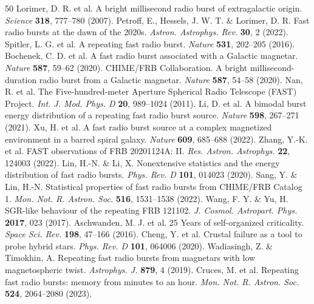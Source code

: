 \documentclass[twocolumn]{article}
\begin{document}

\begin{thebibliography}{50}
 Lorimer, D. R. et al. A bright millisecond radio burst of extragalactic origin. \textit{Science} \textbf{318}, 777--780 (2007).
 Petroff, E., Hessels, J. W. T. \& Lorimer, D. R. Fast radio bursts at the dawn of the 2020s. \textit{Astron. Astrophys. Rev.} \textbf{30}, 2 (2022).
 Spitler, L. G. et al. A repeating fast radio burst. \textit{Nature} \textbf{531}, 202--205 (2016).
 Bochenek, C. D. et al. A fast radio burst associated with a Galactic magnetar. \textit{Nature} \textbf{587}, 59--62 (2020).
 CHIME/FRB Collaboration. A bright millisecond-duration radio burst from a Galactic magnetar. \textit{Nature} \textbf{587}, 54--58 (2020).
 Nan, R. et al. The Five-hundred-meter Aperture Spherical Radio Telescope (FAST) Project. \textit{Int. J. Mod. Phys. D} \textbf{20}, 989--1024 (2011).
 Li, D. et al. A bimodal burst energy distribution of a repeating fast radio burst source. \textit{Nature} \textbf{598}, 267--271 (2021).
 Xu, H. et al. A fast radio burst source at a complex magnetized environment in a barred spiral galaxy. \textit{Nature} \textbf{609}, 685--688 (2022).
 Zhang, Y.-K. et al. FAST observations of FRB 20201124A: II. \textit{Res. Astron. Astrophys.} \textbf{22}, 124003 (2022).
 Lin, H.-N. \& Li, X. Nonextensive statistics and the energy distribution of fast radio bursts. \textit{Phys. Rev. D} \textbf{101}, 014023 (2020).
 Sang, Y. \& Lin, H.-N. Statistical properties of fast radio bursts from CHIME/FRB Catalog 1. \textit{Mon. Not. R. Astron. Soc.} \textbf{516}, 1531--1538 (2022).
 Wang, F. Y. \& Yu, H. SGR-like behaviour of the repeating FRB 121102. \textit{J. Cosmol. Astropart. Phys.} \textbf{2017}, 023 (2017).
 Aschwanden, M. J. et al. 25 Years of self-organized criticality. \textit{Space Sci. Rev.} \textbf{198}, 47--166 (2016).
 Cheng, Y. et al. Crustal failure as a tool to probe hybrid stars. \textit{Phys. Rev. D} \textbf{101}, 064006 (2020).
 Wadiasingh, Z. \& Timokhin, A. Repeating fast radio bursts from magnetars with low magnetospheric twist. \textit{Astrophys. J.} \textbf{879}, 4 (2019).
 Cruces, M. et al. Repeating fast radio bursts: memory from minutes to an hour. \textit{Mon. Not. R. Astron. Soc.} \textbf{524}, 2064--2080 (2023).

\end{thebibliography}
\end{document}
